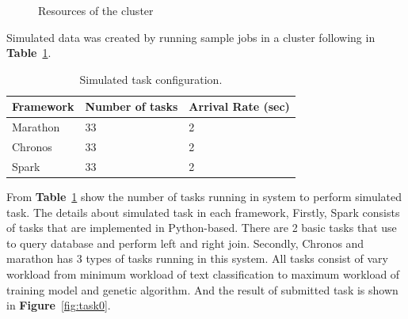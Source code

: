 \documentclass[12pt,oneside,openright,a4paper]{cpe-english-project}
\begin{document}
\begin{figure}[!h]\centering
    \setlength{\fboxrule}{0mm} %
    \setlength{\fboxsep}{0cm}
    \caption{Resources of the cluster}\label{fig:resourcesCluster}
\end{figure}

Simulated data was created by running sample jobs in a cluster following in \textbf{Table}~\ref{tbl:SimulatedTaskConfiguration}.

\begin{table}[!h]
  \caption{Simulated task configuration.}\label{tbl:SimulatedTaskConfiguration}
  \begin{tabular}{@{}|p{}|p{}|p{}|}
    \hline
    \textbf{Framework} & \textbf{Number of tasks} & \textbf{Arrival Rate (sec)} \\
    \hline
    Marathon & 33 & 2 \\
    \hline
    Chronos & 33 & 2 \\ 
    \hline
    Spark & 33 & 2\\
    \hline                          
  \end{tabular}
\end{table}

\hspace{10mm}From \textbf{Table}~\ref{tbl:SimulatedTaskConfiguration} show the number of tasks running in system to perform simulated task. The details about simulated task in each framework, Firstly, Spark consists of tasks that are implemented in Python-based. There are 2 basic tasks that use to query database and perform left and right join. Secondly, Chronos and marathon has 3 types of tasks running in this system. All tasks consist of vary workload from minimum workload of text classification to maximum workload of training model and genetic algorithm. And the result of submitted task is shown in  \textbf{Figure}~\ref{fig:task0}.
\end{document}
